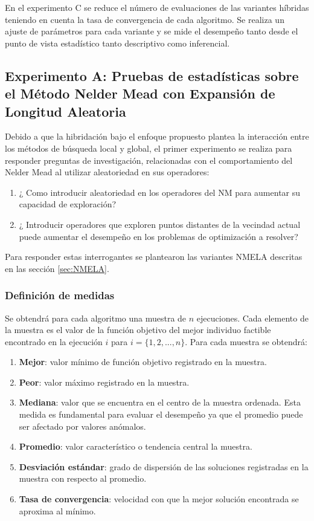 En el experimento C se reduce el número de evaluaciones de las variantes híbridas teniendo en cuenta la tasa de convergencia de cada algoritmo. Se realiza un ajuste de parámetros para cada variante y se mide el desempeño tanto desde el punto de vista estadístico  tanto descriptivo como inferencial.

 \subsection{Experimento A: Pruebas de estadísticas sobre el Método Nelder Mead con Expansión de Longitud Aleatoria}\label{Experimento A: Pruebas de estadísticas sobre el Método Nelder Mead con Expansión de Longitud Aleatoria}

 Debido a que la hibridación bajo el enfoque propuesto plantea la interacción entre los métodos de búsqueda local y global, el primer experimento se realiza para responder preguntas de investigación, relacionadas con el comportamiento del Nelder Mead al utilizar aleatoriedad en sus operadores:
 \begin{enumerate}
 	\item ¿ Como introducir aleatoriedad en los operadores del NM para aumentar su capacidad de exploración?
 	\item ¿ Introducir operadores que exploren puntos distantes de la vecindad actual puede aumentar el desempeño en los problemas de optimización a resolver?
 
 \end{enumerate}
Para responder estas interrogantes se plantearon las variantes NMELA descritas en las sección \ref{sec:NMELA}.
 \subsubsection{Definición de medidas}
 Se obtendrá para cada algoritmo una muestra de $n$ ejecuciones. Cada elemento de la muestra es el valor de la función objetivo del mejor individuo factible encontrado en la ejecución $i$ para $i= \{ 1,2,...,n\}$. Para cada muestra se obtendrá:
 \begin{enumerate}
 	\item \textbf{Mejor}: valor mínimo de función objetivo registrado en la muestra.
 	\item \textbf{Peor}: valor máximo registrado en la muestra.
 	\item \textbf{Mediana}: valor que se encuentra en el centro de la muestra ordenada. Esta medida es fundamental para evaluar el desempeño ya que el promedio puede ser afectado por valores anómalos. 
 	\item \textbf{Promedio}: valor característico o tendencia central la muestra.
 	\item \textbf{Desviación estándar}: grado de dispersión de las soluciones registradas en la muestra con respecto al promedio.
 	\item \textbf{Tasa de convergencia}: velocidad con que la mejor solución encontrada se aproxima al mínimo.  
 \end{enumerate}
